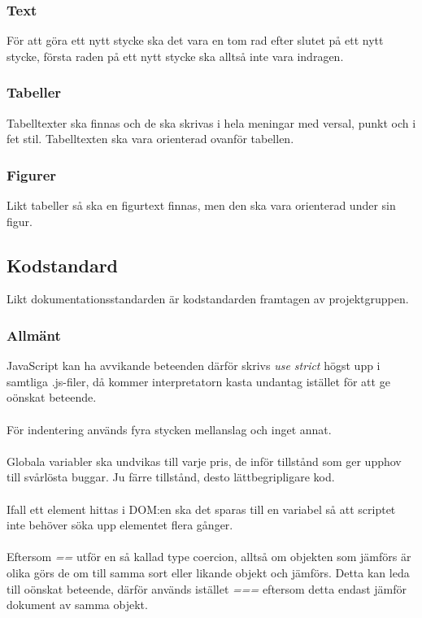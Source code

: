 \subsubsection{Text}
För att göra ett nytt stycke ska det vara en tom rad efter slutet på ett nytt stycke, första raden på ett nytt stycke ska alltså inte vara indragen.
\subsubsection{Tabeller}
Tabelltexter ska finnas och de ska skrivas i hela meningar med versal, punkt och i fet stil. Tabelltexten ska vara orienterad ovanför tabellen.
\subsubsection{Figurer}
Likt tabeller så ska en figurtext finnas, men den ska vara orienterad under sin figur.
\subsection{Kodstandard}
Likt dokumentationsstandarden är kodstandarden framtagen av projektgruppen.
\subsubsection{Allmänt}
JavaScript kan ha avvikande beteenden därför skrivs \textit{use strict} högst upp i samtliga .js-filer, då kommer interpretatorn kasta undantag istället för att ge oönskat beteende.\\ \\
För indentering används fyra stycken mellanslag och inget annat. \\ \\
Globala variabler ska undvikas till varje pris, de inför tillstånd som ger upphov till svårlösta buggar. Ju färre tillstånd, desto lättbegripligare kod. \\ \\
Ifall ett element hittas i DOM:en ska det sparas till en variabel så att scriptet inte behöver söka upp elementet flera gånger. \\ \\
Eftersom \textit{==} utför en så kallad type coercion, alltså om objekten som jämförs är olika görs de om till samma sort eller likande objekt och jämförs. Detta kan leda till oönskat beteende, därför används istället \textit{===} eftersom detta endast jämför dokument av samma objekt.
